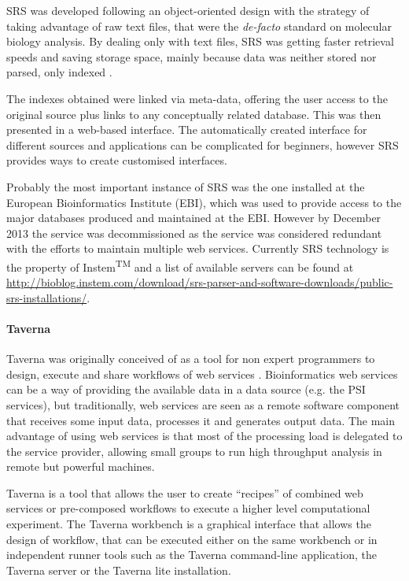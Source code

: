 SRS was developed following an object-oriented design with the strategy of taking advantage of raw text files, that were the \emph{de-facto} standard on molecular biology analysis. By dealing only with text files, SRS was getting faster retrieval speeds and saving storage space, mainly because data was neither stored nor parsed, only indexed \cite{ZDO2002}.

The  indexes obtained were linked via meta-data, offering the user access to the original source plus links to any conceptually related database. This was then presented in a web-based interface. The automatically created interface for different sources and applications can be complicated for beginners, however SRS provides ways to create customised interfaces.

Probably the most important instance of SRS was the one installed at the European Bioinformatics Institute (EBI), which was used to provide access to the major databases produced and maintained at the EBI. However by December 2013 the service was decommissioned as the service was considered redundant with the efforts to maintain multiple web services. Currently SRS technology is the property of Instem\textsuperscript{TM} and a list of available servers can be found at \url{http://bioblog.instem.com/download/srs-parser-and-software-downloads/public-srs-installations/}.

\paragraph{Taverna}
Taverna was originally conceived of as a tool for non expert programmers to design, execute and share workflows of web services \cite{HUL2006}. Bioinformatics web services can be a way of providing the available data in a data source (e.g. the PSI services), but traditionally, web services are seen as a remote software component that receives some input data, processes it and generates output data. The main advantage of using web services  is that most of the processing load is delegated to the service provider, allowing small groups to run high throughput analysis in remote but powerful machines.

Taverna is a tool that allows the user to create ``recipes'' of combined web services or pre-composed workflows to execute a higher level computational experiment. The Taverna workbench is a graphical interface that allows the design of workflow, that can be executed either on the same workbench or in independent runner tools such as the Taverna command-line application, the Taverna server or the Taverna lite installation.

